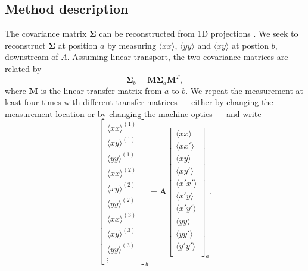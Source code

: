 \subsection{Method description}

The covariance matrix $\bm{\Sigma}$ can be reconstructed from 1D projections \cite{book:Minty2003, Woodley2000, Prat2014}. We seek to reconstruct $\bm{\Sigma}$ at position $a$ by measuring $\langle{xx}\rangle$, $\langle{yy}\rangle$ and $\langle{xy}\rangle$ at postion $b$, downstream of $A$. Assuming linear transport, the two covariance matrices are related by
%
\begin{equation}
    \bm{\Sigma}_b = \mathbf{M} \bm{\Sigma}_a \mathbf{M}^T,
\end{equation}
%
where $\mathbf{M}$ is the linear transfer matrix from $a$ to $b$. We repeat the measurement at least four times with different transfer matrices — either by changing the measurement location or by changing the machine optics — and write
%
\begin{equation}
    \begin{bmatrix}
        {\langle{xx}\rangle}^{(1)} \\
        {\langle{xy}\rangle}^{(1)} \\
        {\langle{yy}\rangle}^{(1)} \\
        {\langle{xx}\rangle}^{(2)} \\
        {\langle{xy}\rangle}^{(2)} \\
        {\langle{yy}\rangle}^{(2)} \\
        {\langle{xx}\rangle}^{(3)} \\
        {\langle{xy}\rangle}^{(3)} \\
        {\langle{yy}\rangle}^{(3)} \\
        \vdots
    \end{bmatrix}_b
    = \mathbf{A}
    \begin{bmatrix}
        \langle{xx}\rangle \\
        \langle{xx'}\rangle \\
        \langle{xy}\rangle \\
        \langle{xy'}\rangle \\
        \langle{x'x'}\rangle \\
        \langle{x'y}\rangle \\
        \langle{x'y'}\rangle \\
        \langle{yy}\rangle \\
        \langle{yy'}\rangle \\
        \langle{y'y'}\rangle \\
    \end{bmatrix}_a
    .
\end{equation}
